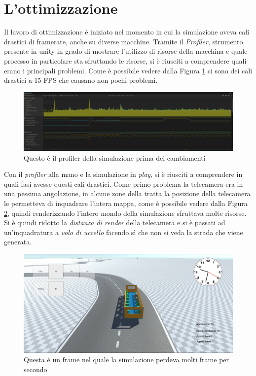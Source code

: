 \documentclass[12pt, openany]{book}
\begin{document}
 	\section{L'ottimizzazione}
 	Il lavoro di ottimizzazione è iniziato nel momento in cui la simulazione aveva cali drastici di framerate, anche su diverse macchine. Tramite il \emph{Profiler}, strumento presente in unity in grado di mostrare l'utilizzo di risorse della macchina e quale processo in particolare sta sfruttando le risorse, si è riusciti a comprendere quali erano i principali problemi. Come è possibile vedere dalla Figura \ref{fig:ProfilerFPSBassi} ci sono dei cali drastici a 15 FPS che causano non pochi problemi.
 	\begin{figure}[H]
 		\centering
 		\includegraphics[width=1\linewidth]{"Immagini/ProfilerFPSBassi.png"}
 		\caption{Questo è il profiler della simulazione prima dei cambiamenti}
 		\label{fig:ProfilerFPSBassi}
 	\end{figure}
 	Con il \emph{profiler} alla mano e la simulazione in \emph{play}, si è riusciti a comprendere in quali fasi avesse questi cali drastici. Come primo problema la telecamera era in una pessima angolazione, in alcune zone della tratta la posizione della telecamera le permetteva di inquadrare l'intera mappa, come è possibile vedere dalla Figura \ref{fig:CameraBrutta}, quindi renderizzando l'intero mondo della simulazione sfruttava molte risorse. Si è quindi ridotto la \emph{distanza di render} della telecamera e si è passati ad un'inquadratura a \emph{volo di uccello} facendo sì che non si veda la strada che viene generata.
 	\begin{figure}[H]
 		\centering
 		\includegraphics[width=1\linewidth]{"Immagini/CameraBrutta.png"}
 		\caption{Questa è un frame nel quale la simulazione perdeva molti frame per secondo}
 		\label{fig:CameraBrutta}
 	\end{figure}
\end{document}
